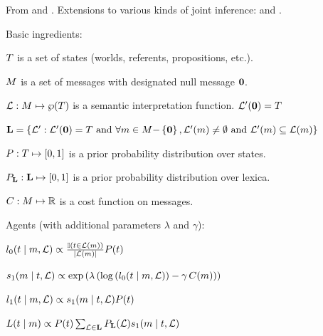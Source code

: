 \documentclass{article}
\begin{document}
\begin{examples}
\item From \citet{Bergen:Goodman:Levy:2012} and
  \citet{Bergen:Levy:Goodman:2014}. Extensions to various kinds of
  joint inference: \citet{Smith:Goodman:Frank:2013} and
  \citet{Kao-etal:2014}.

\item\label{modobjects} Basic ingredients:
  \begin{examples}
  \item $T$ is a set of states (worlds, referents, propositions, etc.).
  \item $M$ is a set of messages with designated null message $\mathbf{0}$.
  \item $\mathcal{L}: M \mapsto \wp(T)$ is a semantic interpretation function. $\mathcal{L}'(\mathbf{0}) = T$
  \item\label{lexset}%
    $\mathbf{L} = \left\{ \mathcal{L}' : \mathcal{L}'(\mathbf{0}) = T \text{ and } \forall m \in M{-}\left\{ \mathbf{0} \right\}, \mathcal{L}'(m) \neq \emptyset \text{ and } \mathcal{L}'(m) \subseteq \mathcal{L}(m) \right\}$
  \item $P : T \mapsto [0,1]$ is a prior probability distribution over states.    
  \item $P_{\mathbf{L}} : \mathbf{L} \mapsto [0,1]$ is a prior probability distribution over lexica.    
  \item $C : M \mapsto \mathbb{R}$ is a cost function on messages.
  \end{examples}

\item Agents (with additional parameters $\lambda$ and $\gamma$):
  \begin{examples}
  \item\label{l0}%
    $l_{0}(t \mid m, \mathcal{L}) \propto
    \frac{\mathbb{I}(t \in \mathcal{L}(m))}{|\mathcal{L}(m)|}
    P(t)$

  \item\label{s1}%
    $s_{1}(m \mid t, \mathcal{L}) \propto
    \exp
    \left(
      \lambda
      \left(
        \log\left(l_{0}(t \mid m, \mathcal{L}) \right)
        - 
        \gamma\,C(m)
      \right)
    \right)$
    
  \item\label{l1}%
    $l_{1}(t \mid m, \mathcal{L}) \propto 
    s_{1}(m \mid t, \mathcal{L})
    P(t)$

  \item\label{L} 
    $L(t \mid m) 
    \propto 
    P(t)
    \sum_{\mathcal{L} \in \mathbf{L}}
    P_{\mathbf{L}}(\mathcal{L})
    s_{1}(m \mid t, \mathcal{L})$
  \end{examples}


\end{examples}
\end{document}
